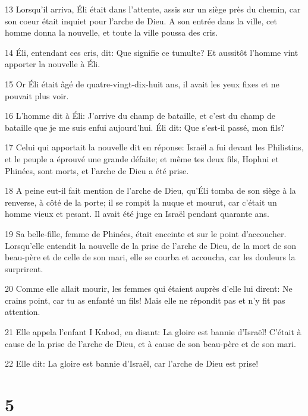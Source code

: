 \par 13 Lorsqu'il arriva, Éli était dans l'attente, assis sur un siège près du chemin, car son coeur était inquiet pour l'arche de Dieu. A son entrée dans la ville, cet homme donna la nouvelle, et toute la ville poussa des cris.
\par 14 Éli, entendant ces cris, dit: Que signifie ce tumulte? Et aussitôt l'homme vint apporter la nouvelle à Éli.
\par 15 Or Éli était âgé de quatre-vingt-dix-huit ans, il avait les yeux fixes et ne pouvait plus voir.
\par 16 L'homme dit à Éli: J'arrive du champ de bataille, et c'est du champ de bataille que je me suis enfui aujourd'hui. Éli dit: Que s'est-il passé, mon fils?
\par 17 Celui qui apportait la nouvelle dit en réponse: Israël a fui devant les Philistins, et le peuple a éprouvé une grande défaite; et même tes deux fils, Hophni et Phinées, sont morts, et l'arche de Dieu a été prise.
\par 18 A peine eut-il fait mention de l'arche de Dieu, qu'Éli tomba de son siège à la renverse, à côté de la porte; il se rompit la nuque et mourut, car c'était un homme vieux et pesant. Il avait été juge en Israël pendant quarante ans.
\par 19 Sa belle-fille, femme de Phinées, était enceinte et sur le point d'accoucher. Lorsqu'elle entendit la nouvelle de la prise de l'arche de Dieu, de la mort de son beau-père et de celle de son mari, elle se courba et accoucha, car les douleurs la surprirent.
\par 20 Comme elle allait mourir, les femmes qui étaient auprès d'elle lui dirent: Ne crains point, car tu as enfanté un fils! Mais elle ne répondit pas et n'y fit pas attention.
\par 21 Elle appela l'enfant I Kabod, en disant: La gloire est bannie d'Israël! C'était à cause de la prise de l'arche de Dieu, et à cause de son beau-père et de son mari.
\par 22 Elle dit: La gloire est bannie d'Israël, car l'arche de Dieu est prise!

\chapter{5}

